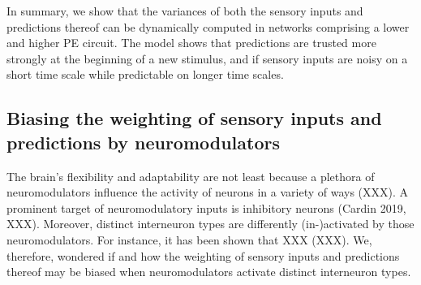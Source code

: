 \documentclass[10pt,a4paper,draft]{article}
\begin{document}
In summary, we show that the variances of both the sensory inputs and predictions thereof can be dynamically computed in networks comprising a lower and higher PE circuit. The model shows that predictions are trusted more strongly at the beginning of a new stimulus, and if sensory inputs are noisy on a short time scale while predictable on longer time scales.


\subsection*{Biasing the weighting of sensory inputs and predictions by neuromodulators}
%
The brain's flexibility and adaptability are not least because a plethora of neuromodulators influence the activity of neurons in a variety of ways (XXX). A prominent target of neuromodulatory inputs is inhibitory neurons (Cardin 2019, XXX). Moreover, distinct interneuron types are differently (in-)activated by those neuromodulators. For instance, it has been shown that XXX (XXX). We, therefore, wondered if and how the weighting of sensory inputs and predictions thereof may be biased when neuromodulators activate distinct interneuron types.
%
\end{document}
